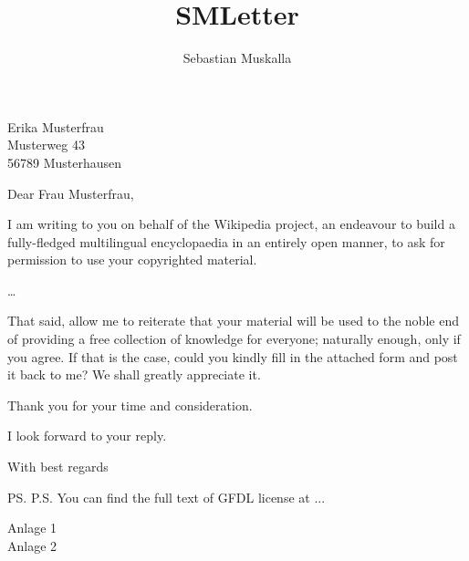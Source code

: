 \documentclass
[
    folder=../style,
    a4paper,
    12pt,
    parskip=half-,
    version=last,
]{../style/smletter}
\title
{
    SMLetter
}
\author
{
    Sebastian Muskalla
}
\begin{document}
    \begin{letter}
    {%
        Erika Musterfrau
        \\
        Musterweg 43
        \\
        56789 Musterhausen
    }%


        \opening{Dear Frau Musterfrau,}

        I am writing to you on behalf of the Wikipedia project, an endeavour to build a fully-fledged multilingual encyclopaedia in an entirely open manner, to ask for permission to use your copyrighted material.

        \ldots

        That said, allow me to reiterate that your material will be used to the noble end of providing a free collection of knowledge for everyone; naturally enough, only if you agree. If that is the case, could you kindly fill in the attached form and post it back to me? We shall greatly appreciate it.

        Thank you for your time and consideration.

        I look forward to your reply.

        \closing{With best regards}

        \ps{P.S. You can find the full text of GFDL license at ...}

        \encl
        {%
        Anlage 1\\
        Anlage 2%
        }%

    \end{letter}
\end{document}
